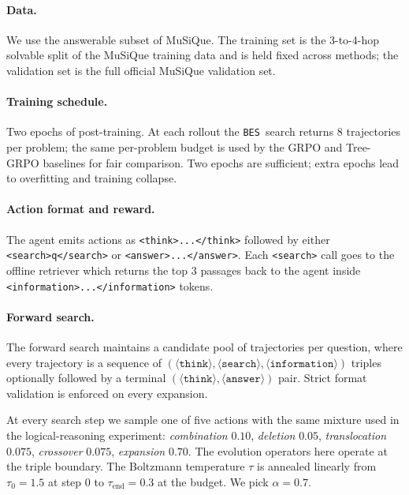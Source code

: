 \documentclass{llmxive}
\providecommand{\ours}{\texttt{BES}}
\begin{document}
\paragraph{Data.}
We use the answerable subset of MuSiQue. The training set is the
3-to-4-hop solvable split of the MuSiQue training data and is held
fixed across methods; the validation set is the full official MuSiQue
validation set. 

\paragraph{Training schedule.}
Two epochs of post-training. At each
rollout the \ours\ search returns $8$ trajectories per problem; the same per-problem budget is used by the GRPO
and Tree-GRPO baselines for fair comparison. Two epochs are sufficient;
extra epochs lead to overfitting and training collapse.

\paragraph{Action format and reward.}
The agent emits actions as
\verb|<think>...</think>| followed by either \verb|<search>q</search>|
or \verb|<answer>...</answer>|. Each \verb|<search>| call goes to the offline
retriever which returns the top $3$ passages back to the agent inside
\verb|<information>...</information>| tokens. 


\paragraph{Forward search.}
The forward search maintains a candidate pool of trajectories per
question, where every trajectory is a sequence of
$(\langle\texttt{think}\rangle,\langle\texttt{search}\rangle,
\langle\texttt{information}\rangle)$ triples optionally followed by a
terminal $(\langle\texttt{think}\rangle,\langle\texttt{answer}\rangle)$
pair. Strict format validation is enforced on every expansion.

At every search step we sample one of five actions with the same
mixture used in the logical-reasoning experiment:
\emph{combination} $0.10$, \emph{deletion} $0.05$, \emph{translocation}
$0.075$, \emph{crossover} $0.075$, \emph{expansion} $0.70$. The evolution operators here operate at the triple boundary. The Boltzmann temperature $\tau$ is annealed linearly from
$\tau_0=1.5$ at step $0$ to $\tau_\mathrm{end}=0.3$ at the budget. We pick $\alpha=0.7$.
\end{document}
